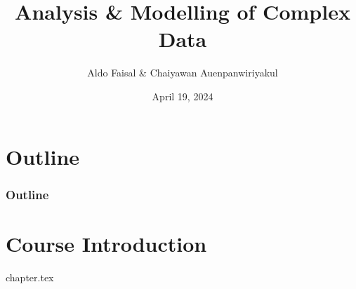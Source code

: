 \documentclass{beamer}
\title{Analysis \& Modelling of Complex Data}
\author{Aldo Faisal \& Chaiyawan Auenpanwiriyakul}
\institute{Universität Bayreuth}
\date{April 19, 2024}
\begin{document}
\frame{\titlepage}

\section{Outline}
\begin{frame}[allowframebreaks]
\frametitle{Outline}
\tableofcontents
\end{frame}

\section{Course Introduction}
{chapter.tex}


\end{document}
